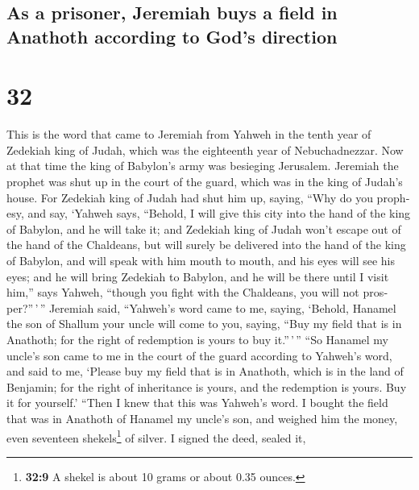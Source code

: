 \begin{paracol}{2}
\switchcolumn
\begin{otherlanguage}{english}

\hypertarget{as-a-prisoner-jeremiah-buys-a-field-in-anathoth-according-to-gods-direction}{%
\subsection{As a prisoner, Jeremiah buys a field in Anathoth according
to God's
direction}\label{as-a-prisoner-jeremiah-buys-a-field-in-anathoth-according-to-gods-direction}}

\hypertarget{section-63}{%
\section{32}\label{section-63}}

 This is the word that came to Jeremiah from Yahweh in the
tenth year of Zedekiah king of Judah, which was the eighteenth year of
Nebuchadnezzar.  Now at that time the king of Babylon's
army was besieging Jerusalem. Jeremiah the prophet was shut up in the
court of the guard, which was in the king of Judah's house.
 For Zedekiah king of Judah had shut him up, saying, ``Why
do you prophesy, and say, `Yahweh says, ``Behold, I will give this city
into the hand of the king of Babylon, and he will take it;
 and Zedekiah king of Judah won't escape out of the hand
of the Chaldeans, but will surely be delivered into the hand of the king
of Babylon, and will speak with him mouth to mouth, and his eyes will
see his eyes;  and he will bring Zedekiah to Babylon, and
he will be there until I visit him,'' says Yahweh, ``though you fight
with the Chaldeans, you will not prosper?''\,'\,'' 
Jeremiah said, ``Yahweh's word came to me, saying, 
`Behold, Hanamel the son of Shallum your uncle will come to you, saying,
``Buy my field that is in Anathoth; for the right of redemption is yours
to buy it.''\,'\,''  ``So Hanamel my uncle's son came to
me in the court of the guard according to Yahweh's word, and said to me,
`Please buy my field that is in Anathoth, which is in the land of
Benjamin; for the right of inheritance is yours, and the redemption is
yours. Buy it for yourself.' ``Then I knew that this was Yahweh's word.
 I bought the field that was in Anathoth of Hanamel my
uncle's son, and weighed him the money, even seventeen
shekels\footnote{\textbf{32:9} A shekel is about 10 grams or about 0.35
  ounces.} of silver.  I signed the deed, sealed it,

\end{otherlanguage}
\end{paracol}
